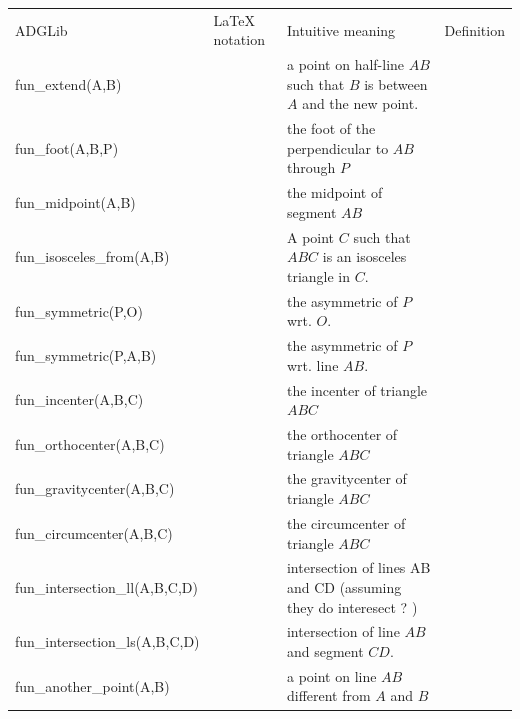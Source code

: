 \documentclass[a4wide,9pt,landscape]{article}
\begin{document}
\noindent\hspace{-75mm}
\begin{tabularx}{270mm}{>{\ttfamily}llXX}
\toprule
\multicolumn{4}{l}{\Huge Points-only; function symbols} \\ \midrule
ADGLib & 
\LaTeX{} notation & 
Intuitive meaning & 
Definition \\ \midrule
fun\_extend(A,B) & &
a point on half-line $AB$ such that $B$ is between $A$ and the new point. \\
fun\_foot(A,B,P) & 
&
the foot of the perpendicular to $AB$ through $P$ \\
fun\_midpoint(A,B) & 
&
the midpoint of segment $AB$ \\
fun\_isosceles\_from(A,B) & 
&
A point $C$ such that $ABC$ is an isosceles triangle in $C$. \\
fun\_symmetric(P,O) & 
&
the asymmetric of $P$ wrt. $O$. \\
fun\_symmetric(P,A,B) & 
&
the asymmetric of $P$ wrt. line $AB$. \\
fun\_incenter(A,B,C) & 
&
the incenter of triangle $ABC$ \\
fun\_orthocenter(A,B,C) & 
&
the orthocenter of triangle $ABC$ \\
fun\_gravitycenter(A,B,C) & 
&
the gravitycenter of triangle $ABC$ \\
fun\_circumcenter(A,B,C) & 
&
the circumcenter of triangle $ABC$ \\
fun\_intersection\_ll(A,B,C,D) & 
&
intersection of lines AB and CD (assuming they do interesect ? ) \\
fun\_intersection\_ls(A,B,C,D) & 
&
intersection of line $AB$ and segment $CD$. \\
fun\_another\_point(A,B) & 
&
a point on line $AB$ different from $A$ and $B$ \\
\bottomrule
\end{tabularx}
\end{document}
